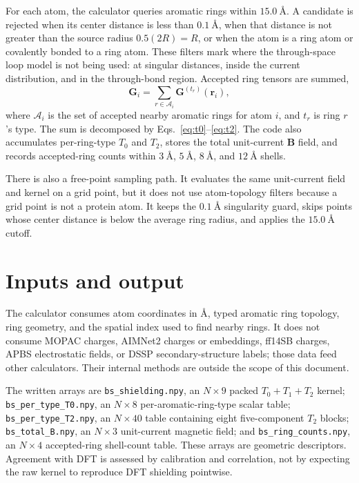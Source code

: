 \documentclass[11pt]{article}
\begin{document}
For each atom, the calculator queries aromatic rings within
\(\SI{15.0}{\angstrom}\). A candidate is rejected when its center distance is
less than \(\SI{0.1}{\angstrom}\), when that distance is not greater than the
source radius \(0.5(2R)=R\), or when the atom is a ring atom or covalently
bonded to a ring atom. These filters mark where the through-space loop model
is not being used: at singular distances, inside the current distribution, and
in the through-bond region. Accepted ring tensors are summed,
\begin{equation}
  \bm G_i=\sum_{r\in\mathcal A_i}\bm G^{(t_r)}(\bm r_i),
  \label{eq:sum}
\end{equation}
where \(\mathcal A_i\) is the set of accepted nearby aromatic rings for atom
\(i\), and \(t_r\) is ring \(r\)'s type. The sum is decomposed by
Eqs.~\eqref{eq:t0}--\eqref{eq:t2}. The code also accumulates per-ring-type
\(T_0\) and \(T_2\), stores the total unit-current \(\bm B\) field, and records
accepted-ring counts within
\(\SI{3}{\angstrom}\), \(\SI{5}{\angstrom}\), \(\SI{8}{\angstrom}\), and
\(\SI{12}{\angstrom}\) shells.

There is also a free-point sampling path. It evaluates the same unit-current
field and kernel on a grid point, but it does not use atom-topology filters
because a grid point is not a protein atom. It keeps the
\(\SI{0.1}{\angstrom}\) singularity guard, skips points whose center distance
is below the average ring radius, and applies the
\(\SI{15.0}{\angstrom}\) cutoff.

\section{Inputs and output}

The calculator consumes atom coordinates in \(\si{\angstrom}\), typed aromatic
ring topology, ring geometry, and the spatial index used to find nearby rings.
It does not consume MOPAC charges, AIMNet2 charges or embeddings, ff14SB
charges, APBS electrostatic fields, or DSSP secondary-structure labels; those
data feed other calculators. Their internal methods are outside the scope of
this document.

The written arrays are \texttt{bs\_shielding.npy}, an \(N\times9\) packed
\(T_0+T_1+T_2\) kernel; \texttt{bs\_per\_type\_T0.npy}, an \(N\times8\)
per-aromatic-ring-type scalar table; \texttt{bs\_per\_type\_T2.npy}, an
\(N\times40\) table containing eight five-component \(T_2\) blocks;
\texttt{bs\_total\_B.npy}, an \(N\times3\) unit-current magnetic field; and
\texttt{bs\_ring\_counts.npy}, an \(N\times4\) accepted-ring shell-count table.
These arrays are geometric descriptors. Agreement with DFT is assessed by
calibration and correlation, not by expecting the raw kernel to reproduce DFT
shielding pointwise.
\end{document}
